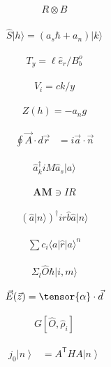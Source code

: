 \documentclass[twocolumn,pra,aps,superscriptaddress]{revtex4-1}
\newcommand{\bra}[1]{\langle{#1}|}
\newcommand{\ket}[1]{|{#1}\rangle}
\begin{document}
\begin{align}
R\otimes B
\end{align}

\begin{align}
\hat S\ket{h} = (a_s\hbar + a_n)\ket{k}
\end{align}

\begin{align}
T_y = \ell\hat{e}_r/B_b^o
\end{align}

\begin{align}
V_i =c k/y
\end{align}

\begin{align}
Z(h) = -a_n g
\end{align}

\newpage
\begin{align}
\oint \vec{A} \cdot d \vec{r} &= i \vec{a} \cdot \vec{n}
\end{align}

\begin{align}
\hat{a}^{\dagger}_k i M \hat{a}_s \ket{a}
\end{align}

\begin{align} %
\mathbf{AM} \ni IR
\end{align}

\begin{align} %
\left(\hat{a} \ket{n} \right)^{\dagger} i r  \hat{b} \hat{a} \ket{n}
\end{align}

\begin{align} %
\sum c_i \bra{a} \hat{r} \ket{a}^n
\end{align}

\begin{align} %
\Sigma_{l} \hat{O} \hbar \ket{i, m}
\end{align}

\begin{align} %
\vec{E}(\vec{z}) = \tensor{\alpha} \cdot \vec{d}
\end{align}

\begin{align} %
G\left[\hat{O}, \hat{\rho}_i \right]
\end{align}

\begin{align}
j_0\left\vert n\right\rangle&=A^\mathsf{T}HA\left\vert n\right\rangle
\end{align}
\end{document}
